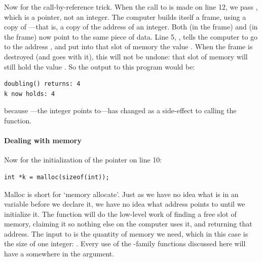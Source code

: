 \documentclass[12pt]{article}
\makeatletter
\def\cind#1{\index{#1@\ci{#1}}\ci{#1}}
\makeatother
\begin{document}
Now for the call-by-reference trick.  When the call to 
is made on line 12, we pass , which is a pointer, not
an integer. The computer builds itself a frame, using a copy of
---that is, a copy of the address of an integer. Both
 (in the  frame) and  (in the
 frame) now point to the same piece of data.  Line 5,
, tells the computer to go to the address
, and put into that slot of memory the value . When the frame is destroyed (and  goes with it),
this will not be undone: that slot of memory will still hold the value
.  So the output to this program would be: 
\begin{lstlisting}
doubling() returns: 4
k now holds: 4
\end{lstlisting}
because ---the integer  points to---has changed as a
side-effect to calling the  function.

\paragraph{Dealing with memory}  
 
Now for the initialization of the pointer on line 10:
\begin{lstlisting}
int *k = malloc(sizeof(int));
\end{lstlisting}
Malloc is short for `memory allocate'. Just as we have no idea what
is in an  variable before we declare it, we have no
idea what address  points to until we initialize it. The
function  will do the low-level work of finding
a free slot of memory, claiming it so nothing else on the computer
uses it, and returning that address. The input to  is the
quantity of memory we need, which in this case is the size of one
integer: . Every use of the -family
functions discussed here will have a \cind{sizeof} somewhere in the
argument.

\index{\&}
\end{document}
